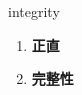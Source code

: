 
\begin{frame}
{\huge integrity}
\begin{center}
\begin{enumerate}\Large
  \item \textbf{正直}
  \item \textbf{完整性}
\end{enumerate}
\end{center}
\end{frame}
